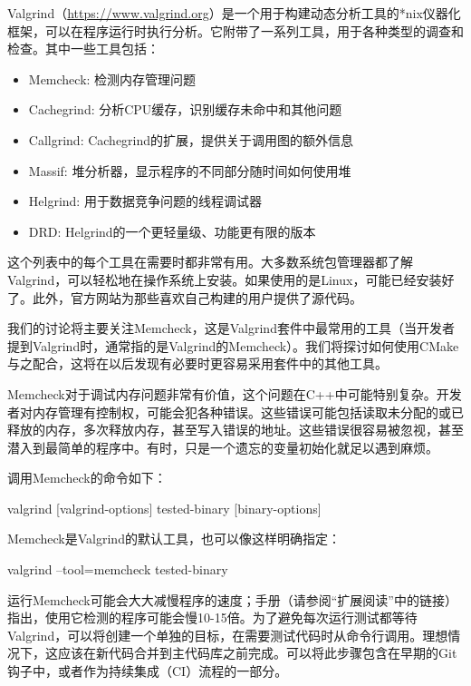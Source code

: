 
Valgrind（\url{https://www.valgrind.org}）是一个用于构建动态分析工具的*nix仪器化框架，可以在程序运行时执行分析。它附带了一系列工具，用于各种类型的调查和检查。其中一些工具包括：

\begin{itemize}
\item
Memcheck: 检测内存管理问题

\item
Cachegrind: 分析CPU缓存，识别缓存未命中和其他问题

\item
Callgrind: Cachegrind的扩展，提供关于调用图的额外信息

\item
Massif: 堆分析器，显示程序的不同部分随时间如何使用堆

\item
Helgrind: 用于数据竞争问题的线程调试器

\item
DRD: Helgrind的一个更轻量级、功能更有限的版本
\end{itemize}

这个列表中的每个工具在需要时都非常有用。大多数系统包管理器都了解Valgrind，可以轻松地在操作系统上安装。如果使用的是Linux，可能已经安装好了。此外，官方网站为那些喜欢自己构建的用户提供了源代码。

我们的讨论将主要关注Memcheck，这是Valgrind套件中最常用的工具（当开发者提到Valgrind时，通常指的是Valgrind的Memcheck）。我们将探讨如何使用CMake与之配合，这将在以后发现有必要时更容易采用套件中的其他工具。


Memcheck对于调试内存问题非常有价值，这个问题在C++中可能特别复杂。开发者对内存管理有控制权，可能会犯各种错误。这些错误可能包括读取未分配的或已释放的内存，多次释放内存，甚至写入错误的地址。这些错误很容易被忽视，甚至潜入到最简单的程序中。有时，只是一个遗忘的变量初始化就足以遇到麻烦。

调用Memcheck的命令如下：

\begin{shell}
valgrind [valgrind-options] tested-binary [binary-options]
\end{shell}

Memcheck是Valgrind的默认工具，也可以像这样明确指定：

\begin{shell}
valgrind --tool=memcheck tested-binary
\end{shell}

运行Memcheck可能会大大减慢程序的速度；手册（请参阅“扩展阅读”中的链接）指出，使用它检测的程序可能会慢10-15倍。为了避免每次运行测试都等待Valgrind，可以将创建一个单独的目标，在需要测试代码时从命令行调用。理想情况下，这应该在新代码合并到主代码库之前完成。可以将此步骤包含在早期的Git钩子中，或者作为持续集成（CI）流程的一部分。

